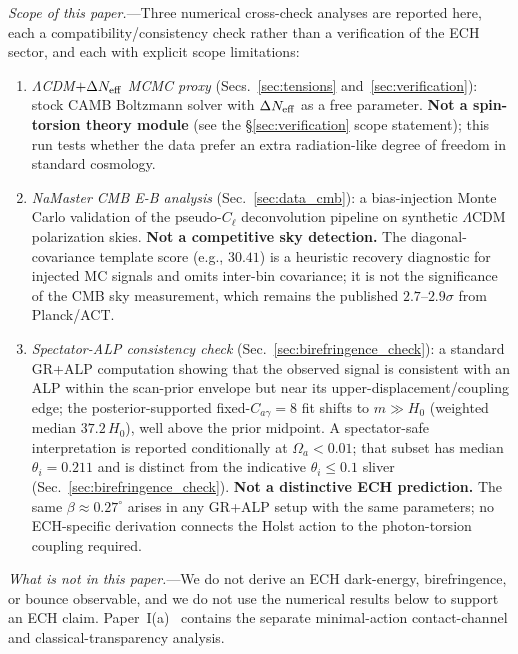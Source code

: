 \documentclass[aps,prd,twocolumn,superscriptaddress,showpacs,preprintnumbers,nofootinbib,longbibliography,floatfix]{revtex4-2}
\newcommand{\Neff}{N_{\rm eff}}
\begin{document}
\textit{Scope of this paper.}---Three numerical cross-check analyses are reported
here, each a compatibility/consistency check rather than a verification of the
ECH sector, and each with explicit scope limitations:
\begin{enumerate}[leftmargin=*]
\item \textit{$\Lambda$CDM$+\Delta\Neff$ MCMC proxy} (Secs.~\ref{sec:tensions}
and~\ref{sec:verification}): stock CAMB Boltzmann solver with $\Delta\Neff$ as
a free parameter. \textbf{Not a spin-torsion theory module} (see the
\S\ref{sec:verification} scope statement); this run tests whether the data prefer
an extra radiation-like degree of freedom in standard cosmology.

\item \textit{NaMaster CMB E-B analysis} (Sec.~\ref{sec:data_cmb}): a
bias-injection Monte Carlo validation of the pseudo-$C_\ell$ deconvolution
pipeline on synthetic $\Lambda$CDM polarization skies.
\textbf{Not a competitive sky detection.} The diagonal-covariance template
score (e.g., $30.41$) is a heuristic recovery diagnostic for injected MC
signals and omits inter-bin covariance; it is not the significance of the CMB
sky measurement, which remains the published
$2.7$--$2.9\sigma$ from Planck/ACT.

\item \textit{Spectator-ALP consistency check} (Sec.~\ref{sec:birefringence_check}):
a standard GR+ALP computation showing that the observed signal is consistent
with an ALP within the scan-prior envelope but near its upper-displacement/coupling
edge; the posterior-supported fixed-$C_{a\gamma}\!=\!8$ fit shifts to
$m\!\gg\!H_0$ (weighted median $37.2\,H_0$), well above the prior midpoint.
A spectator-safe interpretation is reported conditionally at $\Omega_a<0.01$;
that subset has median $\theta_i=0.211$ and is distinct from the indicative
$\theta_i\le0.1$ sliver (Sec.~\ref{sec:birefringence_check}).
\textbf{Not a distinctive ECH prediction.}
The same $\beta\approx 0.27^\circ$ arises in any GR+ALP setup with the same
parameters; no ECH-specific derivation connects the Holst action to the
photon-torsion coupling required.
\end{enumerate}

\textit{What is not in this paper.}---We do not derive an ECH dark-energy,
birefringence, or bounce observable, and we do not use the numerical results
below to support an ECH claim.  Paper~I(a)~\cite{Golden2026P1a} contains the
separate minimal-action contact-channel and classical-transparency analysis.
\end{document}
